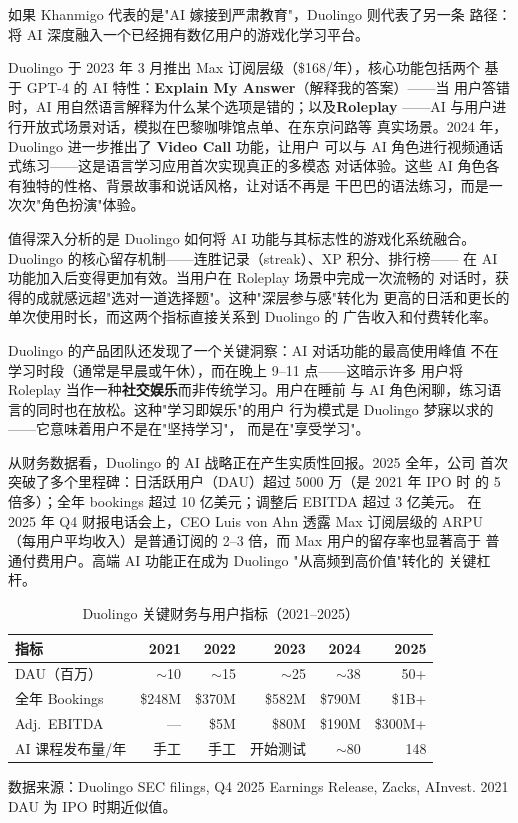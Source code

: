 如果 Khanmigo 代表的是"AI 嫁接到严肃教育"，Duolingo 则代表了另一条
路径：将 AI 深度融入一个已经拥有数亿用户的游戏化学习平台。

Duolingo 于 2023 年 3 月推出 Max 订阅层级（\$168/年），核心功能包括两个
基于 GPT-4 的 AI 特性：\textbf{Explain My Answer}（解释我的答案）——当
用户答错时，AI 用自然语言解释为什么某个选项是错的；以及\textbf{Roleplay}
——AI 与用户进行开放式场景对话，模拟在巴黎咖啡馆点单、在东京问路等
真实场景。2024 年，Duolingo 进一步推出了 \textbf{Video Call} 功能，让用户
可以与 AI 角色进行视频通话式练习——这是语言学习应用首次实现真正的多模态
对话体验。这些 AI 角色各有独特的性格、背景故事和说话风格，让对话不再是
干巴巴的语法练习，而是一次次"角色扮演"体验。

值得深入分析的是 Duolingo 如何将 AI 功能与其标志性的游戏化系统融合。
Duolingo 的核心留存机制——连胜记录（streak）、XP 积分、排行榜——
在 AI 功能加入后变得更加有效。当用户在 Roleplay 场景中完成一次流畅的
对话时，获得的成就感远超"选对一道选择题"。这种"深层参与感"转化为
更高的日活和更长的单次使用时长，而这两个指标直接关系到 Duolingo 的
广告收入和付费转化率。

Duolingo 的产品团队还发现了一个关键洞察：AI 对话功能的最高使用峰值
不在学习时段（通常是早晨或午休），而在晚上 9--11 点——这暗示许多
用户将 Roleplay 当作一种\textbf{社交娱乐}而非传统学习。用户在睡前
与 AI 角色闲聊，练习语言的同时也在放松。这种"学习即娱乐"的用户
行为模式是 Duolingo 梦寐以求的——它意味着用户不是在"坚持学习"，
而是在"享受学习"。

从财务数据看，Duolingo 的 AI 战略正在产生实质性回报。2025 全年，公司
首次突破了多个里程碑：日活跃用户（DAU）超过 5000 万（是 2021 年 IPO 时
的 5 倍多）；全年 bookings 超过 10 亿美元；调整后 EBITDA 超过 3 亿美元。
在 2025 年 Q4 财报电话会上，CEO Luis von Ahn 透露 Max 订阅层级的 ARPU
（每用户平均收入）是普通订阅的 2--3 倍，而 Max 用户的留存率也显著高于
普通付费用户。高端 AI 功能正在成为 Duolingo "从高频到高价值"转化的
关键杠杆。

\begin{table}[htbp]
\centering
\caption{Duolingo 关键财务与用户指标（2021--2025）}
\label{tab:duolingo-metrics}
\small
\begin{tabularx}{\textwidth}{l r r r r r}
\toprule
\rowcolor{figLightGray}
\textbf{指标} & \textbf{2021} & \textbf{2022} & \textbf{2023} & \textbf{2024} & \textbf{2025} \\
\midrule
DAU（百万）           & $\sim$10 & $\sim$15 & $\sim$25 & $\sim$38 & 50+ \\
全年 Bookings         & \$248M   & \$370M   & \$582M   & \$790M   & \$1B+  \\
Adj.~EBITDA           & ---      & \$5M     & \$80M    & \$190M   & \$300M+ \\
AI 课程发布量/年      & 手工     & 手工     & 开始测试 & $\sim$80 & 148 \\
\bottomrule
\end{tabularx}

\medskip
\noindent \small 数据来源：Duolingo SEC filings, Q4 2025 Earnings Release,
Zacks, AInvest. 2021 DAU 为 IPO 时期近似值。
\end{table}

